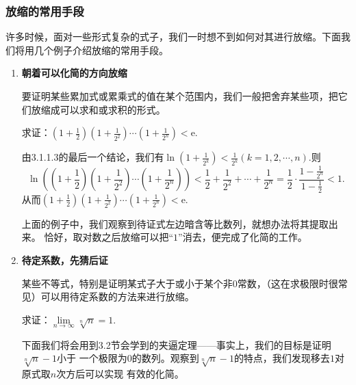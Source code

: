 \subsubsection{放缩的常用手段}
\label{sssec:A}
许多时候，面对一些形式复杂的式子，我们一时想不到如何对其进行放缩。下面我们将用几个例子介绍放缩的常用手段。
\begin{enumerate}[label = \textbf{\arabic*.}]
    \item \textbf{朝着可以化简的方向放缩}

          要证明某些累加式或累乘式的值在某个范围内，我们一般把舍弃某些项，把它们放缩成可以求和或求积的形式。
          \begin{example}
              求证：$\left ( 1+\frac{1}{2}\right )\left ( 1+\frac{1}{2^2}\right )
                  \cdots \left ( 1+\frac{1}{2^n}\right )<\mathrm{e}$.
          \end{example}
          \begin{prove}
              由3.1.1.3的最后一个结论，我们有$\ln \left ( 1+\frac{1}{2^k}\right )<\frac{1}{2^k}(k=1,2,\cdots,n)$.则
              \[
                  \ln\left( \left ( 1+\frac{1}{2}\right )\left ( 1+\frac{1}{2^2}\right )
                  \cdots \left ( 1+\frac{1}{2^n}\right ) \right) <\frac{1}{2}+\frac{1}{2^2}
                  +\cdots+\frac{1}{2^n}=\frac{1}{2}\cdot \frac{1-\frac{1}{2^n}}{1-\frac{1}{2}}<1
                  .\]
              从而$\left ( 1+\frac{1}{2}\right )\left ( 1+\frac{1}{2^2}\right )
                  \cdots \left ( 1+\frac{1}{2^n}\right )<\mathrm{e}$.
          \end{prove}


          上面的例子中，我们观察到待证式左边暗含等比数列，就想办法将其提取出来。
          恰好，取对数之后放缩可以把“$1$”消去，便完成了化简的工作。

    \item \textbf{待定系数，先猜后证}

          某些不等式，特别是证明某式子大于或小于某个非0常数，（这在求极限时很常见）可以用待定系数的方法来进行放缩。
          \begin{example}
              求证：$\lim\limits_{n \to \infty}\sqrt[n]{n}=1.$
          \end{example}
          \begin{prove}
              下面我们将会用到3.2节会学到的夹逼定理——事实上，我们的目标是证明$\sqrt[n]{n}-1$小于
              一个极限为$0$的数列。观察到$\sqrt[n]{n}-1$的特点，我们发现移去$1$对原式取$n$次方后可以实现
              有效的化简。



\end{prove}
\end{enumerate}
